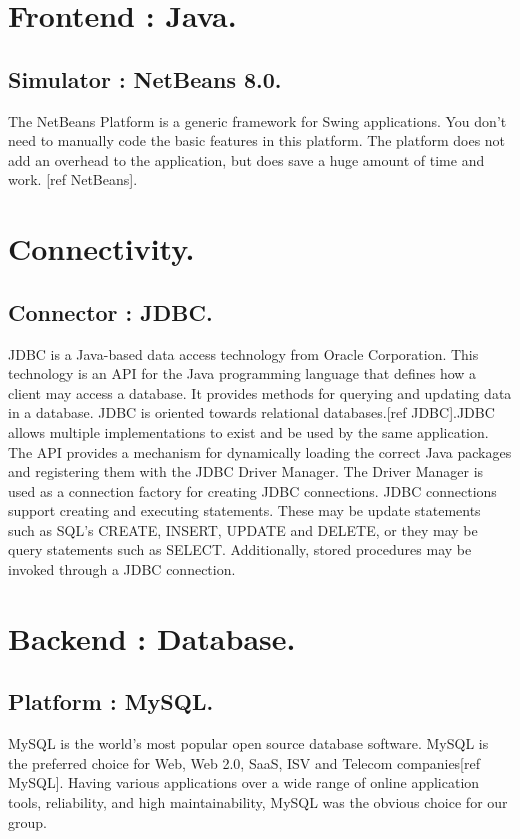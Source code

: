 \documentclass[12pt,a4paper]{report}
\begin{document}
\section{Frontend : Java.}
\subsection{Simulator : NetBeans 8.0.}
The NetBeans Platform is a generic framework for Swing applications. You don't need to manually code the basic features in this platform. The platform does not add an overhead to the application, but does save a huge amount of time and work. [ref NetBeans].

\section{Connectivity.}
\subsection{Connector : JDBC.}
JDBC is a Java-based data access technology from Oracle Corporation. This technology is an API for the Java programming language that defines how a client may access a database. It provides methods for querying and updating data in a database. JDBC is oriented towards relational databases.[ref JDBC].JDBC allows multiple implementations to exist and be used by the same application. The API provides a mechanism for dynamically loading the correct Java packages and registering them with the JDBC Driver Manager. The Driver Manager is used as a connection factory for creating JDBC connections. JDBC connections support creating and executing statements. These may be update statements such as SQL's CREATE, INSERT, UPDATE and DELETE, or they may be query statements such as SELECT. Additionally, stored procedures may be invoked through a JDBC connection. 

\section{Backend : Database.}
\subsection{Platform : MySQL.}
MySQL is the world's most popular open source database software. MySQL is the preferred choice for Web, Web 2.0, SaaS, ISV and Telecom companies[ref MySQL]. Having various applications over a wide range of online application tools, reliability, and high maintainability, MySQL was the obvious choice for our group.
\end{document}
